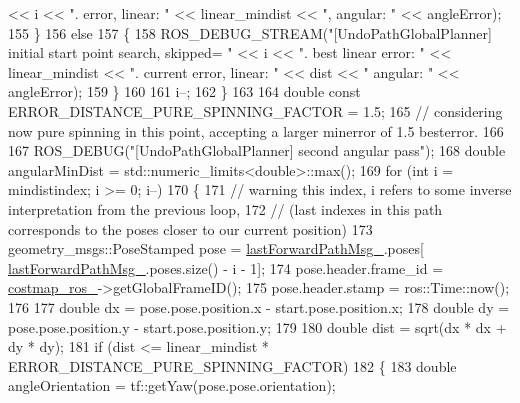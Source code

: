 \begin{DoxyCode}
       << i << \textcolor{stringliteral}{". error, linear: "} << linear\_mindist << \textcolor{stringliteral}{", angular: "} << angleError);
155                 \}
156                 \textcolor{keywordflow}{else}
157                 \{
158                     ROS\_DEBUG\_STREAM(\textcolor{stringliteral}{"[UndoPathGlobalPlanner] initial start point search, skipped= "} << i 
      << \textcolor{stringliteral}{". best linear error: "} << linear\_mindist << \textcolor{stringliteral}{". current error, linear: "} << dist << \textcolor{stringliteral}{" angular: "} << 
      angleError);
159                 \}
160 
161                 i--;
162             \}
163 
164             \textcolor{keywordtype}{double} \textcolor{keyword}{const} ERROR\_DISTANCE\_PURE\_SPINNING\_FACTOR = 1.5;
165             \textcolor{comment}{// considering now pure spinning in this point, accepting a larger minerror of 1.5 besterror.}
166 
167             ROS\_DEBUG(\textcolor{stringliteral}{"[UndoPathGlobalPlanner] second angular pass"});
168             \textcolor{keywordtype}{double} angularMinDist = std::numeric\_limits<double>::max();
169             \textcolor{keywordflow}{for} (\textcolor{keywordtype}{int} i = mindistindex; i >= 0; i--)
170             \{
171                 \textcolor{comment}{// warning this index, i refers to some inverse interpretation from the previous loop,}
172                 \textcolor{comment}{// (last indexes in this path corresponds to the poses closer to our current position)}
173                 geometry\_msgs::PoseStamped pose = \hyperlink{classcl__move__base__z_1_1undo__path__global__planner_1_1UndoPathGlobalPlanner_a9a4a6e40f5b6cb5f77dedbc5b6170871}{lastForwardPathMsg\_}.poses[
      \hyperlink{classcl__move__base__z_1_1undo__path__global__planner_1_1UndoPathGlobalPlanner_a9a4a6e40f5b6cb5f77dedbc5b6170871}{lastForwardPathMsg\_}.poses.size() - i - 1];
174                 pose.header.frame\_id = \hyperlink{classcl__move__base__z_1_1undo__path__global__planner_1_1UndoPathGlobalPlanner_ab63eeb465e3ae989a6edcc4d059cf8f0}{costmap\_ros\_}->getGlobalFrameID();
175                 pose.header.stamp = ros::Time::now();
176 
177                 \textcolor{keywordtype}{double} dx = pose.pose.position.x - start.pose.position.x;
178                 \textcolor{keywordtype}{double} dy = pose.pose.position.y - start.pose.position.y;
179 
180                 \textcolor{keywordtype}{double} dist = sqrt(dx * dx + dy * dy);
181                 \textcolor{keywordflow}{if} (dist <= linear\_mindist * ERROR\_DISTANCE\_PURE\_SPINNING\_FACTOR)
182                 \{
183                     \textcolor{keywordtype}{double} angleOrientation = tf::getYaw(pose.pose.orientation);

\end{DoxyCode}
